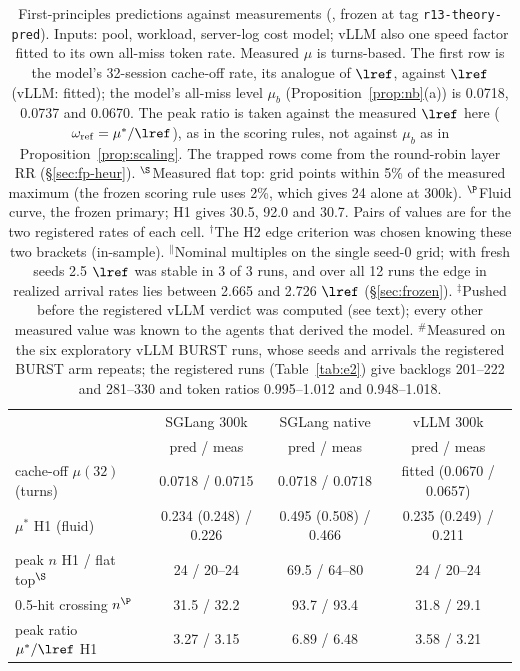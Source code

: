 \begin{table}[t]\centering\footnotesize
\caption{First-principles predictions against measurements (, frozen at tag \texttt{r13-theory-pred}). Inputs: pool, workload, server-log cost model; vLLM also one speed factor fitted to its own all-miss token rate. Measured $\mu$ is turns-based. The first row is the model's 32-session cache-off rate, its analogue of $\lref$, against $\lref$ (vLLM: fitted); the model's all-miss level $\mu_b$ (Proposition~\ref{prop:nb}(a)) is 0.0718, 0.0737 and 0.0670\sps. The peak ratio is taken against the measured $\lref$ here ($\omega_{\mathrm{ref}}=\mu^*/\lref$), as in the scoring rules, not against $\mu_b$ as in Proposition~\ref{prop:scaling}. The trapped rows come from the round-robin layer RR (\S\ref{sec:fp-heur}). $^\S$Measured flat top: grid points within 5\% of the measured maximum (the frozen scoring rule uses 2\%, which gives 24 alone at 300k). $^\P$Fluid curve, the frozen primary; H1 gives 30.5, 92.0 and 30.7. Pairs of values are for the two registered rates of each cell. $^\dagger$The H2 edge criterion was chosen knowing these two brackets (in-sample). $^\|$Nominal multiples on the single seed-0 grid; with fresh seeds 2.5 $\lref$ was stable in 3 of 3 runs, and over all 12 runs the edge in realized arrival rates lies between 2.665 and 2.726 $\lref$ (\S\ref{sec:frozen}). $^\ddagger$Pushed before the registered vLLM verdict was computed (see text); every other measured value was known to the agents that derived the model. $^{\#}$Measured on the six exploratory vLLM BURST runs, whose seeds and arrivals the registered BURST arm repeats; the registered runs (Table~\ref{tab:e2}) give backlogs 201--222 and 281--330 and token ratios 0.995--1.012 and 0.948--1.018.}\label{tab:fpval}
\begin{tabular}{@{}lccc@{}}\toprule
 & SGLang 300k & SGLang native & vLLM 300k\\
 & pred / meas & pred / meas & pred / meas\\\midrule
cache-off $\mu(32)$ (turns) & 0.0718 / 0.0715 & 0.0718 / 0.0718 & fitted (0.0670 / 0.0657)\\
$\mu^*$ H1 (fluid) & 0.234 (0.248) / 0.226 & 0.495 (0.508) / 0.466 & 0.235 (0.249) / 0.211\\
peak $n$ H1 / flat top$^\S$ & 24 / 20--24 & 69.5 / 64--80 & 24 / 20--24\\
0.5-hit crossing $n^\P$ & 31.5 / 32.2 & 93.7 / 93.4 & 31.8 / 29.1\\
peak ratio $\mu^*/\lref$ H1 & 3.27 / 3.15 & 6.89 / 6.48 & 3.58 / 3.21\\

\end{tabular}
\end{table}

